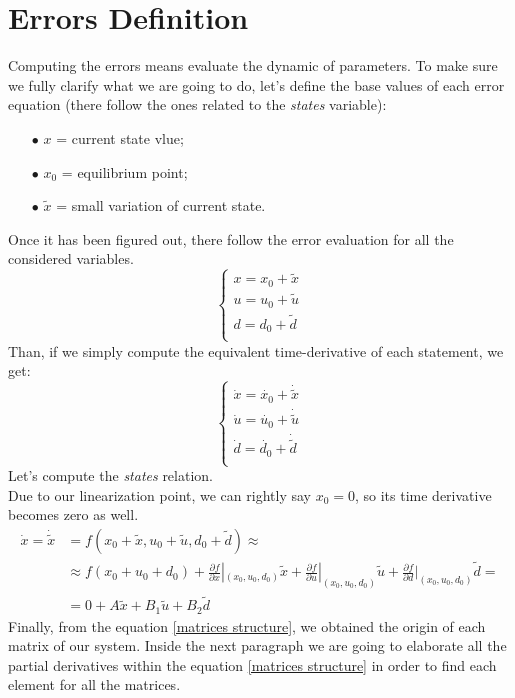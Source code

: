 \documentclass[a4paper,12pt,titlepage]{report}
\begin{document}
\section{Errors Definition}
	Computing the errors means evaluate the dynamic of parameters. To make sure we fully clarify what we are going to do, let's define the base values of each error equation (there follow the ones related to the \textit{states} variable):
		\begin{itemize}
			\item[$\bullet$] $x$ = current state vlue;
			\item[$\bullet$] $x_{0}$ = equilibrium point;
			\item[$\bullet$] $\tilde{x}$ = small variation of current state.
		\end{itemize}
	Once it has been figured out, there follow the error evaluation for all the considered variables.
		\begin{equation*}
			\begin{cases}
				x = x_{0} + \tilde{x} \\
				u = u_{0} + \tilde{u} \\
				d = d_{0} + \tilde{d} \\
			\end{cases}
		\end{equation*}
	Than, if we simply compute the equivalent time-derivative of each statement, we get:
		\begin{equation*}
			\begin{cases}
				\dot{x} = \dot{x_{0}} + \dot{\tilde{x}} \\
				\dot{u} = \dot{u_{0}} + \dot{\tilde{u}} \\
				\dot{d} = \dot{d_{0}} + \dot{\tilde{d}} \\
			\end{cases}
		\end{equation*}
	Let's compute the \textit{states} relation.\\
	Due to our linearization point, we can rightly say $x_{0} = 0 $, so its time derivative becomes zero as well.
		\begin{equation} \label{matrices structure}
			\begin{split}
				\dot{x}  = \dot{\tilde{x}} &= f(x_{0}+\tilde{x},u_{0}+\tilde{u},d_{0} + \tilde{d}) \approx \\
				&\approx f(x_{0}+u_{0}+d_{0}) + \frac{\partial f}{\partial x} |_{(x_{0},u_{0},d_{0})} \tilde{x} + \frac{\partial f}{\partial u} |_{(x_{0},u_{0},d_{0})} \tilde{u} + \frac{\partial f}{\partial d} |_{(x_{0},u_{0},d_{0})} \tilde{d} = \\
				&= 0 + A \tilde{x} + B_{1} \tilde{u} + B_{2} \tilde{d}
			\end{split}
		\end{equation}
	Finally, from the equation \ref{matrices structure}, we obtained the origin of each matrix of our system. Inside the next paragraph we are going to elaborate all the partial derivatives within the equation \ref{matrices structure} in order to find each element for all the matrices.
\end{document}
